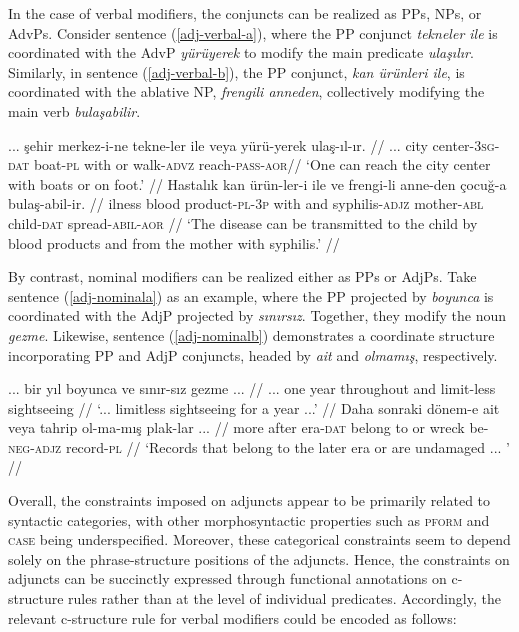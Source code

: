 In the case of verbal modifiers, the conjuncts can be realized as PPs, NPs, or AdvPs. Consider sentence (\ref{adj-verbal-a}), where the PP conjunct \textit{tekneler ile} is coordinated with the AdvP \textit{yürüyerek} to modify the main predicate \textit{ulaşılır}. Similarly, in sentence (\ref{adj-verbal-b}), the PP conjunct, \textit{kan ürünleri ile}, is coordinated with the ablative NP, \textit{frengili anneden}, collectively modifying the main verb \textit{bulaşabilir}.

\pex[glspace=!1em,everygla={},everyglb={},aboveglbskip=-.15ex, interpartskip=15pt]
\label{adj-verbal} 
\a\label{adj-verbal-a} 
\begingl
\gla ... şehir merkez-i-ne tekne-ler ile veya yürü-yerek ulaş-ıl-ır. //
\glb ... city center-\textsc{3sg}-\textsc{dat} boat-\textsc{pl} with or walk-\textsc{advz} reach-\textsc{pass}-\textsc{aor}//
\glft `One can reach the city center with boats or on foot.'  //
\endgl
\a\label{adj-verbal-b} 
\begingl
\gla Hastalık kan ürün-ler-i ile ve frengi-li anne-den çocuğ-a bulaş-abil-ir. //
\glb ilness blood product-\textsc{pl}-\textsc{3p} with and syphilis-\textsc{adjz} mother-\textsc{abl} child-\textsc{dat} spread-\textsc{abil}-\textsc{aor} //
\glft `The disease can be transmitted to the child by blood products and from the mother with syphilis.'  //
\endgl
\xe

By contrast, nominal modifiers can be realized either as PPs or AdjPs. Take sentence (\ref{adj-nominala}) as an example, where the PP projected by \textit{boyunca} is coordinated with the AdjP projected by \textit{sınırsız}. Together, they modify the noun \textit{gezme}. Likewise, sentence (\ref{adj-nominalb}) demonstrates a coordinate structure incorporating PP and AdjP conjuncts, headed by \textit{ait} and \textit{olmamış}, respectively.

\pex[glspace=!1em,everygla={},everyglb={},aboveglbskip=-.15ex, interpartskip=15pt]
\label{adj-nominal} 
\a\label{adj-nominala} 
\begingl
\gla ... bir yıl boyunca ve sınır-sız gezme ... //
\glb ... one year throughout and limit-less sightseeing  //
\glft `... limitless sightseeing for a year ...'  //
\endgl
\a\label{adj-nominalb} 
\begingl
\gla Daha sonraki dönem-e ait veya tahrip ol-ma-mış plak-lar ... //
\glb more after era-\textsc{dat} {belong to} or wreck be-\textsc{neg}-\textsc{adjz} record-\textsc{pl} //
\glft `Records that belong to the later era or are undamaged ... '  //
\endgl
\xe

Overall, the constraints imposed on adjuncts appear to be primarily related to syntactic categories, with other morphosyntactic properties such as \textsc{pform} and \textsc{case} being underspecified. Moreover, these categorical constraints seem to depend solely on the phrase-structure positions of the adjuncts. Hence, the constraints on adjuncts can be succinctly expressed through functional annotations on c-structure rules rather than at the level of individual predicates. Accordingly, the relevant c-structure rule for verbal modifiers could be encoded as follows:

